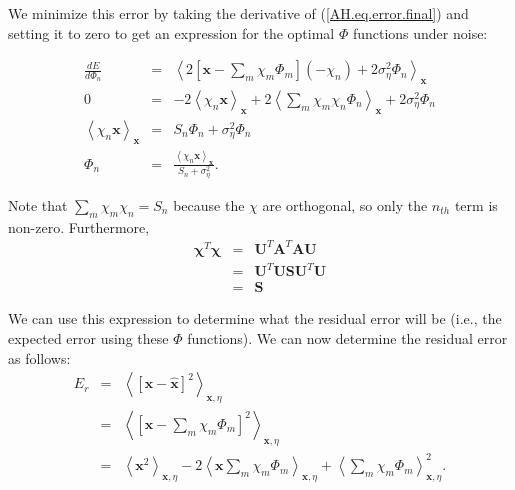 \documentclass[10pt,letterpaper,oneside]{article}
\begin{document}
We minimize this error by taking the derivative of (\ref{AH.eq.error.final})
and setting it to zero to get an expression for the optimal $\Phi$
functions under noise: 

\begin{eqnarray}
\frac{dE}{d\Phi_{n}} & = & \left\langle 2\left[\mathbf{x}-\sum_{m}\chi_{m}\Phi_{m}\right](-\chi_{n})+2\sigma_{\eta}^{2}\Phi_{n}\right\rangle _{\mathbf{x}}\nonumber \\
0 & = & -2\left\langle \chi_{n}\mathbf{x}\right\rangle _{\mathbf{x}}+2\left\langle \sum_{m}\chi_{m}\chi_{n}\Phi_{n}\right\rangle _{\mathbf{x}}+2\sigma_{\eta}^{2}\Phi_{n}\nonumber \\
\left\langle \chi_{n}\mathbf{x}\right\rangle _{\mathbf{x}} & = & S_{n}\Phi_{n}+\sigma_{\eta}^{2}\Phi_{n}\nonumber \\
\Phi_{n} & = & \frac{\left\langle \chi_{n}\mathbf{x}\right\rangle _{\mathbf{x}}}{S_{n}+\sigma_{\eta}^{2}}.\label{AH.eq.Phi2}
\end{eqnarray}

Note that $\sum_m \chi_m \chi_n = S_n$ because the $\chi$ are orthogonal, so only the $n_{th}$ term is non-zero. Furthermore, 
\begin{eqnarray*}
  \mathbf{\chi}^T \mathbf{\chi} &=& \mathbf{U}^T \mathbf{A}^T \mathbf{A} \mathbf{U} \\
  &=& \mathbf{U}^T \mathbf{U} \mathbf{S} \mathbf{U}^T \mathbf{U} \\
  &=& \mathbf{S}
\end{eqnarray*}

We can use this expression to determine what the residual error will
be (i.e., the expected error using these $\Phi$ functions). We can now determine the residual error as follows:
\begin{eqnarray*}
E_{r} & = & \left\langle \left[\mathbf{x}-\hat{\mathbf{x}}\right]^{2}\right\rangle _{\mathbf{x},\eta}\\
 & = & \left\langle \left[\mathbf{x}-\sum_{m}\chi_{m}\Phi_{m}\right]^{2}\right\rangle _{\mathbf{x},\eta}\\
 & = & \left\langle \mathbf{x}^{2}\right\rangle _{\mathbf{x},\eta}-2\left\langle \mathbf{x}\sum_{m}\chi_{m}\Phi_{m}\right\rangle _{\mathbf{x},\eta}+\left\langle \sum_{m}\chi_{m}\Phi_{m}\right\rangle _{\mathbf{x},\eta}^{2}.
\end{eqnarray*}
\end{document}
